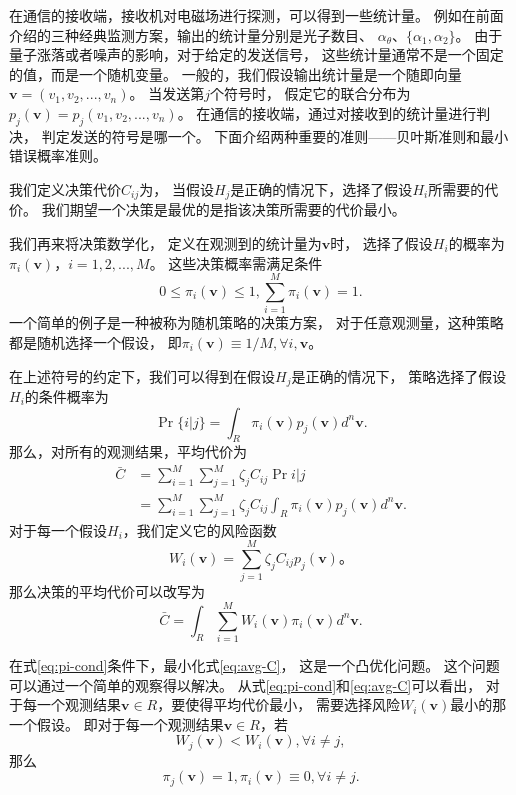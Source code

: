 在通信的接收端，接收机对电磁场进行探测，可以得到一些统计量。
例如在前面介绍的三种经典监测方案，输出的统计量分别是光子数目、
$\alpha_\theta$、$\{\alpha_1, \alpha_2\}$。
由于量子涨落或者噪声的影响，对于给定的发送信号，
这些统计量通常不是一个固定的值，而是一个随机变量。
一般的，我们假设输出统计量是一个随即向量$\bm{v} = (v_1, v_2, ..., v_n)$。
当发送第$j$个符号时，
假定它的联合分布为
$p_j(\bm{v}) = p_j(v_1, v_2, ..., v_n)$。
在通信的接收端，通过对接收到的统计量进行判决，
判定发送的符号是哪一个。
下面介绍两种重要的准则——贝叶斯准则和最小错误概率准则。

我们定义决策代价$C_{ij}$为，
当假设$H_j$是正确的情况下，选择了假设$H_i$所需要的代价。
我们期望一个决策是最优的是指该决策所需要的代价最小。

我们再来将决策数学化\cite{yzf2002tjxhcl,helstrom1976quantum}，
定义在观测到的统计量为$\bm{v}$时，
选择了假设$H_i$的概率为$\pi_i(\bm{v})$，$i=1,2,...,M$。
这些决策概率需满足条件
\begin{equation}
0 \le \pi_i(\bm{v}) \le 1,  \sum_{i=1}^M \pi_i(\bm{v}) = 1.
\label{eq:pi-cond}
\end{equation}
一个简单的例子是一种被称为随机策略的决策方案，
对于任意观测量，这种策略都是随机选择一个假设，
即$\pi_i(\bm{v}) \equiv 1/M, \forall i, \bm{v}$。

在上述符号的约定下，我们可以得到在假设$H_j$是正确的情况下，
策略选择了假设$H_i$的条件概率为
\begin{equation}
\Pr\{i|j\} = \int_R \pi_i(\bm{v}) p_j(\bm{v}) d^n \bm{v}.
\end{equation}
那么，对所有的观测结果，平均代价为
\begin{equation}
\begin{split}
\bar{C} &= \sum_{i=1}^M \sum_{j=1}^M \zeta_j C_{ij} \Pr{i|j} \\
 &= \sum_{i=1}^M \sum_{j=1}^M \zeta_j C_{ij} \int_R \pi_i(\bm{v}) p_j(\bm{v}) d^n \bm{v}.
\end{split}
\end{equation}
对于每一个假设$H_i$，我们定义它的风险函数
\begin{equation}
W_i(\bm{v}) = \sum_{j=1}^M \zeta_j C_{ij} p_j(\bm{v})。
\end{equation}
那么决策的平均代价可以改写为
\begin{equation}
\bar{C} =  \int_R \sum_{i=1}^M W_i(\bm{v}) \pi_i(\bm{v}) d^n \bm{v}.
\label{eq:avg-C}
\end{equation}

在式\ref{eq:pi-cond}条件下，最小化式\ref{eq:avg-C}，
这是一个凸优化问题。
这个问题可以通过一个简单的观察得以解决。
从式\ref{eq:pi-cond}和\ref{eq:avg-C}可以看出，
对于每一个观测结果$\bm{v} \in R$，要使得平均代价最小，
需要选择风险$W_i(\bm{v})$最小的那一个假设。
即对于每一个观测结果$\bm{v} \in R$，若
\begin{equation}
W_j(\bm{v}) < W_i(\bm{v}), \forall i \neq j,
\end{equation}
那么
\begin{equation}
\pi_j(\bm{v})=1, \pi_i(\bm{v}) \equiv 0, \forall i \neq j.
\end{equation}

